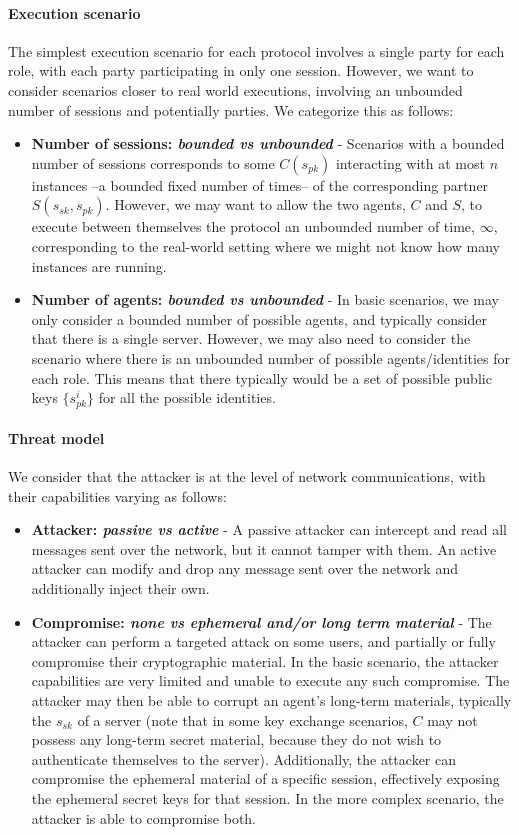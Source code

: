 \documentclass{article}
\newcommand{\sfsk}{\mathit{sk}}
\newcommand{\sfpk}{\mathit{pk}}
\begin{document}
\paragraph{Execution scenario} The simplest execution scenario for each protocol involves a single party for each role, with each party participating in only one session. However, we want to consider scenarios closer to real world executions, involving an unbounded number of sessions and potentially parties.
We categorize this as follows:
\begin{itemize}
\item \textbf{Number of sessions: \emph{bounded vs unbounded}} - Scenarios with a bounded number of sessions corresponds to some $C(s_\sfpk)$ interacting with at most $n$ instances --a bounded fixed number of times-- of the corresponding partner $S(s_\sfsk,s_\sfpk)$. However, we may want to allow the two agents, $C$ and $S$, to execute between themselves the protocol an unbounded number of time, $\infty$, corresponding to the real-world setting where we might not know how many instances are running.
\item \textbf{Number of agents: \emph{bounded vs unbounded}} - In basic scenarios, we may only consider a bounded number of possible agents, and typically consider that there is a single server. However, we may also need to consider the scenario where there is an unbounded number of possible agents/identities for each role. This means that there typically would be a set of possible public keys $\{s_\sfpk^i\}$ for all the possible identities.
\end{itemize}


\paragraph{Threat model}

We consider that the attacker is at the level of network communications, with their capabilities varying as follows:

\begin{itemize}
\item \textbf{Attacker: \emph{passive vs active}} - A passive attacker can intercept and read all messages sent over the network, but it cannot tamper with them. An active attacker can modify and drop any message sent over the network and additionally inject their own.
  \item \textbf{Compromise: \emph{none vs ephemeral and/or long term material}} - The attacker can perform a targeted attack on some users, and partially or fully compromise their cryptographic material. In the basic scenario, the attacker capabilities are very limited and unable to execute any such compromise. 
  The attacker may then be able to corrupt an agent's long-term materials, typically the $s_\sfsk$ of a server (note that in some key exchange scenarios, $C$ may not possess any long-term secret material, because they do not wish to authenticate themselves to the server). Additionally, the attacker can compromise the ephemeral material of a specific session, effectively exposing the ephemeral secret keys for that session. In the more complex scenario, the attacker is able to compromise both.
 \end{itemize}
\end{document}
